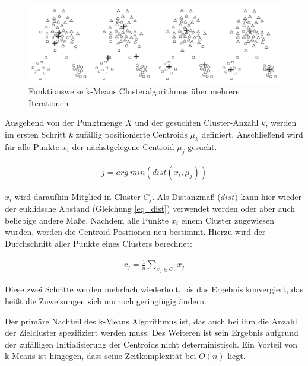 \begin{figure}[H]
    \centering
    \includegraphics[width=0.9\linewidth]{resources/img/grundlagen/k-means}
    \caption[Funktionsweise k-Means Clusteralgorithmus]
            {Funktionsweise k-Means Clusteralgorithmus über mehrere Iterationen \cite[]{tan2007introduction}}
    \label{fig:grund_kmeans_clustering}
\end{figure}

Ausgehend von der Punktmenge $X$ und der gesuchten Cluster-Anzahl $k$,
werden im ersten Schritt $k$ zufällig positionierte Centroids $\mu_k$ definiert.
Anschließend wird für alle Punkte $x_i$ der nächstgelegene Centroid $\mu_j$ gesucht.

\begin{ceqn}
\begin{align}
    \label{eq_kmeans2}
    j = arg\ min(dist(x_i, \mu_j))
\end{align}
\end{ceqn}

$x_i$ wird daraufhin Mitglied in Cluster $C_j$. Als Distanzmaß ($dist$) kann hier wieder der euklidsche Abstand
(Gleichung \ref{eq_dist}) verwendet werden oder aber auch beliebige andere Maße.
Nachdem alle Punkte $x_i$ einem Cluster zugewiesen wurden, werden die Centroid Positionen neu bestimmt.
Hierzu wird der Durchschnitt aller Punkte eines Clusters berechnet:

\begin{ceqn}
\begin{align}
    \label{eq_kmeans3}
    c_j = \frac{1}{n} \sum_{x_j \in C_j} x_j
\end{align}
\end{ceqn}

Diese zwei Schritte werden mehrfach wiederholt, bis das Ergebnis konvergiert, das heißt die Zuweisungen sich
nurnoch geringfügig ändern. \cite[]{Jain2010}

Der primäre Nachteil des k-Means Algorithmus ist, das auch bei ihm die Anzahl der Zielcluster spezifiziert
werden muss. Des Weiteren ist sein Ergebnis aufgrund der zufälligen Initialisierung der Centroids
nicht deterministisch. Ein Vorteil von k-Means ist hingegen, dass seine Zeitkomplexität bei $O(n)$ liegt.

